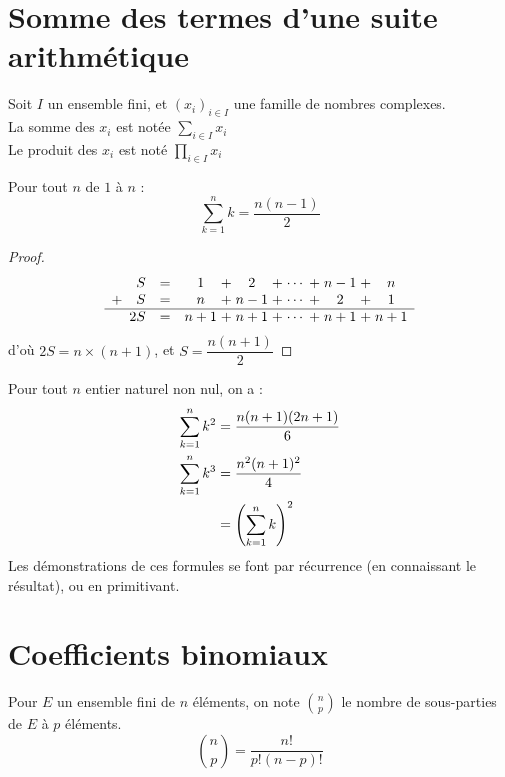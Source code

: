 \documentclass[11pt,a4paper,fleqn,pdftex]{report}
\begin{document}
\section{Somme des termes d'une suite arithmétique} %
\label{sec:sommes_arithmetiques}
\begin{dfn}
     Soit $I$ un ensemble fini, et $(x_i)_{i\in I}$ une famille de nombres complexes. \\[\baselineskip]
     La somme des $x_i$ est notée $\sum_{i\in I} x_i$\\
     Le produit des $x_i$ est noté $\prod_{i\in I} x_i$
\end{dfn}
\begin{theorem}
     Pour tout $n$ de $1$ à $n$ : 
     \begin{equation}
     \sum_{k=1}^n k = \dfrac{n(n-1)}{2}
     \end{equation}
\end{theorem}
\begin{proof}
\begin{equation}
     \begin{array}{r c *{4}{c@{\; + \;}} c}
          S & = & 1 & 2 & \cdots & n-1 & n \\
          +\quad S & = & n & n-1 & \cdots & 2 & 1 \\
          \hline
          2S & = & n+1 & n+1 & \cdots & n+1 & n+1
     \end{array}
\end{equation}
d'où $2S = n \times (n+1)$, et $S=\dfrac{n(n+1)}{2}$
\end{proof}
\begin{theorem}
    Pour tout $n$ entier naturel non nul, on a : 
    \begin{subequations}
         \begin{align}
              \sum_{k=1}^n k^2 &= \dfrac{n(n+1)(2n+1)}{6} \\
              \sum_{k=1}^n k^3 &= \dfrac{n^2(n+1)^2}{4} \\
               &= \left( \sum_{k=1}^n k \right)^2 \notag
         \end{align}
    \end{subequations}
    Les démonstrations de ces formules se font par récurrence (en connaissant le résultat), ou en primitivant.
\end{theorem}
\section{Coefficients binomiaux} %
\label{sec:coefficients_binomiaux}
\begin{dfn}
     Pour $E$ un ensemble fini de $n$ éléments, on note $\binom{n}{p}$ le nombre de sous-parties de $E$ à $p$ éléments.
     \begin{equation}
     \binom{n}{p} = \dfrac{n!}{p!(n-p)!}
     \end{equation}
\end{dfn}
\end{document}
